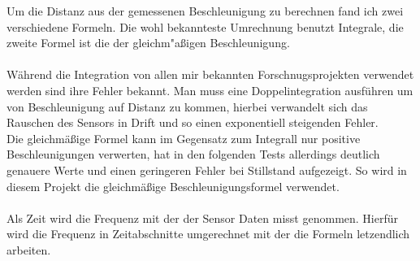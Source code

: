 Um die Distanz aus der gemessenen Beschleunigung zu berechnen
fand ich zwei verschiedene Formeln. Die wohl bekannteste Umrechnung 
benutzt Integrale, die zweite Formel ist die der gleichm"aßigen 
Beschleunigung.\\
\\
Während die Integration von allen mir bekannten Forschnugsprojekten
verwendet werden sind ihre Fehler bekannt. Man muss eine Doppelintegration
ausführen um von Beschleunigung auf Distanz zu kommen, hierbei verwandelt 
sich das Rauschen des Sensors in Drift und so einen exponentiell steigenden
Fehler. \\ 
Die gleichmäßige Formel kann im Gegensatz zum Integrall nur positive 
Beschleunigungen verwerten, hat in den folgenden Tests allerdings 
deutlich genauere Werte und einen geringeren Fehler bei Stillstand 
aufgezeigt. So wird in diesem Projekt die gleichmäßige Beschleunigungsformel 
verwendet.\\
\\
Als Zeit wird die Frequenz mit der der Sensor Daten misst 
genommen. Hierfür wird die Frequenz in Zeitabschnitte umgerechnet mit 
der die Formeln letzendlich arbeiten.